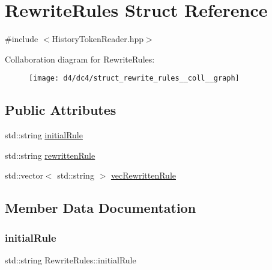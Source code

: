 \hypertarget{struct_rewrite_rules}{}\section{Rewrite\+Rules Struct Reference}
\label{struct_rewrite_rules}


{\ttfamily \#include $<$History\+Token\+Reader.\+hpp$>$}



Collaboration diagram for Rewrite\+Rules\+:\nopagebreak
\begin{figure}[H]
\begin{center}
\leavevmode
\texttt{[image: d4/dc4/struct\_rewrite\_rules\_\_coll\_\_graph]}
\end{center}
\end{figure}
\subsection*{Public Attributes}
\begin{DoxyCompactItemize}
\item 
std\+::string \mbox{\hyperlink{struct_rewrite_rules_a8ab1d58bcaf0a7997954d7930da0c622}{initial\+Rule}}
\item 
std\+::string \mbox{\hyperlink{struct_rewrite_rules_a8b43af4c21fe8159a6f2ff51292830fe}{rewritten\+Rule}}
\item 
std\+::vector$<$ std\+::string $>$ \mbox{\hyperlink{struct_rewrite_rules_ae4d826d219e89b6d6d09aee82c45294d}{vec\+Rewritten\+Rule}}
\end{DoxyCompactItemize}


\subsection{Member Data Documentation}
\mbox{\label{struct_rewrite_rules_a8ab1d58bcaf0a7997954d7930da0c622}} 
\subsubsection{\texorpdfstring{initial\+Rule}{initialRule}}
{\footnotesize\ttfamily std\+::string Rewrite\+Rules\+::initial\+Rule}

\mbox{\label{struct_rewrite_rules_a8b43af4c21fe8159a6f2ff51292830fe}} 
